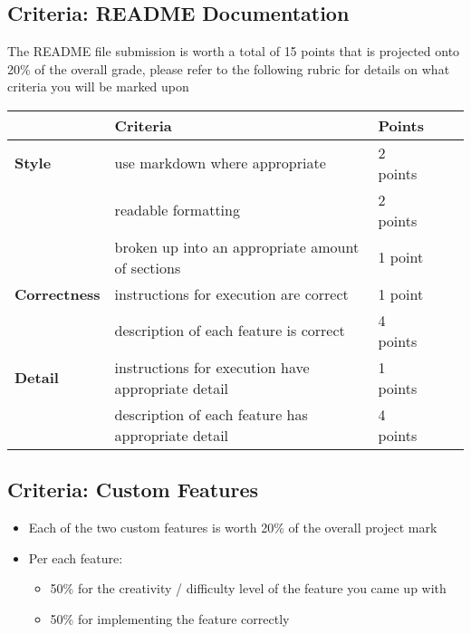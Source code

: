\documentclass[11pt]{article}
\begin{document}
\subsection{Criteria: README Documentation}
\label{sec:orgff862cb}
The README file submission is worth a total of {\color{purple}15 points}
that is projected onto {\color{purple}20\% of the overall grade}, please
refer to the following rubric for details on what criteria you will be marked
upon

\begin{center}
\begin{tabular}{|l|l|l|l|l|}
 & \textbf{Criteria} & \textbf{Points}\\
\hline
\textbf{Style} & use markdown where appropriate & 2 points\\
 & readable formatting & 2 points\\
 & broken up into an appropriate amount of sections & 1 point\\
\hline
\textbf{Correctness} & instructions for execution are correct & 1 point\\
 & description of each feature is correct & 4 points\\
\hline
\textbf{Detail} & instructions for execution have appropriate detail & 1 points\\
 & description of each feature has appropriate detail & 4 points\\
\end{tabular}
\end{center}

\subsection{Criteria: Custom Features}
\label{sec:orgd691c48}
\begin{itemize}
\item Each of the two custom features is worth {\color{purple}20\%} of the overall project mark
\item Per each feature:
\begin{itemize}
\item {\color{purple}50\%} for the creativity / difficulty level of
the feature you came up with
\item {\color{purple}50\%} for implementing the feature correctly
\end{itemize}
\end{itemize}
\end{document}
